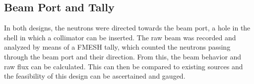 \subsection{Beam Port and Tally}

In both designs, the neutrons were directed towards the beam port, a hole in the shell in which a collimator can be inserted. The raw beam was recorded and analyzed by means of a FMESH tally, which counted the neutrons passing through the beam port and their direction. From this, the beam behavior and raw flux can be calculated. This can then be compared to existing sources and the feasibility of this design can be ascertained and gauged.
